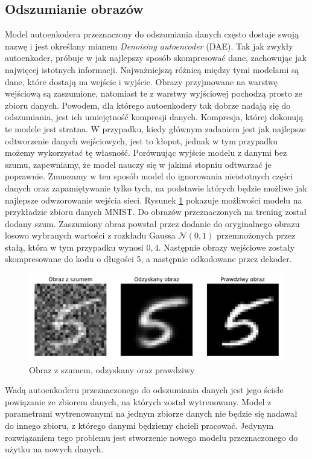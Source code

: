 \documentclass[a4paper,12pt,oneside]{book} %
\begin{document}
\subsection{Odszumianie obrazów}
Model autoenkodera przeznaczony do odszumiania danych często dostaje swoją nazwę i jest określany mianem \textit{Denoising autoencoder} (DAE). Tak jak zwykły autoenkoder, próbuje w jak najlepszy sposób skompresować dane, zachowując jak najwięcej istotnych informacji. Najważniejszą różnicą między tymi modelami są dane, które dostają na wejście i wyjście. Obrazy przyjmowane na warstwę wejściową są zaszumione, natomiast te z warstwy wyjściowej pochodzą prosto ze zbioru danych.
Powodem, dla którego autoenkodery tak dobrze nadają się do odszumiania, jest ich umiejętność kompresji danych. Kompresja, której dokonują te modele jest stratna. W przypadku, kiedy głównym zadaniem jest jak najlepsze odtworzenie danych wejściowych, jest to kłopot, jednak w tym przypadku możemy wykorzystać tę własność. Porównując wyjście modelu z danymi bez szumu, zapewniamy, że model nauczy się w jakimś stopniu odtwarzać je poprawnie. Zmuszamy w ten sposób model do ignorowania nieistotnych części danych oraz zapamiętywanie tylko tych, na podstawie których będzie możliwe jak najlepsze odwzorowanie wejścia sieci.
Rysunek \ref{fig:noisedae} pokazuje możliwości modelu na przykładzie zbioru danych MNIST. Do obrazów przeznaczonych na trening został dodany szum. Zaszumiony obraz powstał przez dodanie do oryginalnego obrazu losowo wybranych wartości z rozkładu Gaussa $\mathcal{N}(0,1)$ przemnożonych przez stałą, która w tym przypadku wynosi $0,4$. Następnie obrazy wejściowe zostały skompresowane do kodu o długości 5, a następnie odkodowane przez dekoder. 
\begin{figure}[h!]
	\centering\includegraphics[width=14.5cm]{denoisingae.pdf}
	\caption{Obraz z szumem, odzyskany oraz prawdziwy}
	\label{fig:noisedae}
\end{figure}

Wadą autoenkoderu przeznaczonego do odszumiania danych jest jego ścisłe powiązanie ze zbiorem danych, na których został wytrenowany. Model z parametrami wytrenowanymi na jednym zbiorze danych nie będzie się nadawał do innego zbioru, z którego danymi będziemy chcieli pracować. Jedynym rozwiązaniem tego problemu jest stworzenie nowego modelu przeznaczonego do użytku na nowych danych. 
\end{document}
